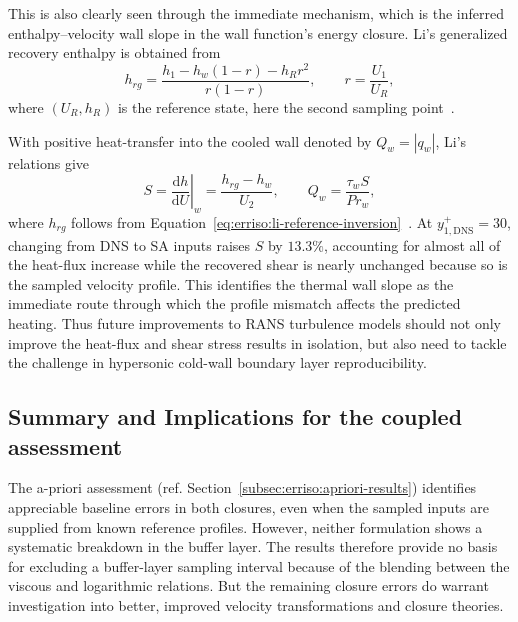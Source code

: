 This is also clearly seen through the immediate mechanism, which is the inferred enthalpy--velocity wall slope in the wall function's energy closure. Li's generalized recovery enthalpy is obtained from
\begin{equation}
    h_{rg}
    =\frac{h_1-h_w(1-r)-h_Rr^2}{r(1-r)},
    \qquad r=\frac{U_1}{U_R},
    \label{eq:erriso:li-reference-inversion}
\end{equation}
where \((U_R,h_R)\) is the reference state, here the second sampling point~\cite[Eq.~(40)]{li2025WF}.

With positive heat-transfer into the cooled wall denoted by \(Q_w=|q_w|\), Li's relations give
\begin{equation}
    S=\left.\frac{\mathrm{d}h}{\mathrm{d}U}\right|_w
      =\frac{h_{rg}-h_w}{U_2},
    \qquad Q_w=\frac{\tau_w S}{Pr_w},
    \label{eq:erriso:li-profile-wall-slope}
\end{equation}
where \(h_{rg}\) follows from Equation~\eqref{eq:erriso:li-reference-inversion}~\cite[Eqs.~(40)--(41)]{li2025WF}. At \(y_{1,\mathrm{DNS}}^+=30\), changing from DNS to SA inputs raises \(S\) by \(13.3\%\), accounting for almost all of the heat-flux increase while the recovered shear is nearly unchanged because so is the sampled velocity profile. This identifies the thermal wall slope as the immediate route through which the profile mismatch affects the predicted heating. Thus future improvements to RANS turbulence models should not only improve the heat-flux and shear stress results in isolation, but also need to tackle the challenge in hypersonic cold-wall boundary layer reproducibility. 

\subsection{Summary and Implications for the coupled assessment}
The a-priori assessment (ref. Section~\ref{subsec:erriso:apriori-results}) identifies appreciable baseline errors in both closures, even when the sampled inputs are supplied from known reference profiles. However, neither formulation shows a systematic breakdown in the buffer layer. The results therefore provide no basis for excluding a buffer-layer sampling interval because of the blending between the viscous and logarithmic relations. But the remaining closure errors do warrant investigation into better, improved velocity transformations and closure theories.
\par\medskip

